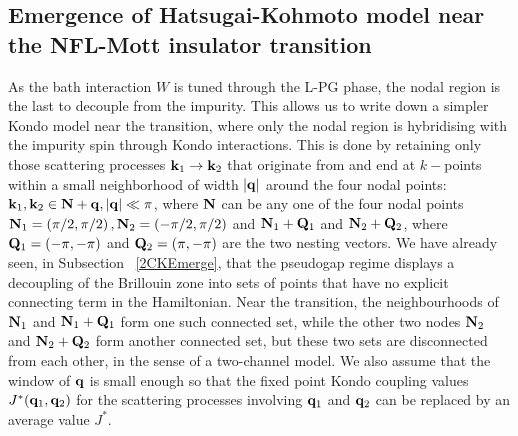 \documentclass[reprint,hidelinks,onecolumn]{revtex4-2}
\begin{document}
\subsection{Emergence of Hatsugai-Kohmoto model near the NFL-Mott insulator transition}\label{hkmDerivation}
As the bath interaction \(W\) is tuned through the L-PG phase, the nodal region is the last to decouple from the impurity. This allows us to write down a simpler Kondo model near the transition, where only the nodal region is hybridising with the impurity spin through Kondo interactions. This is done by retaining only those scattering processes \({\bf k}_1 \to {\bf k}_2\) that originate from and end at \(k-\)points within a small neighborhood of width \(|{\bf q}|\) around the four nodal points: \({\bf k}_1, {\bf k}_2 \in {\bf N} + {\bf q}, |{\bf q}| \ll \pi\), where \({\bf N}\) can be any one of the four nodal points \({\bf N}_{1} = \left(\pi/2, \pi/2\right), {\bf N}_{2} = \left(-\pi/2, \pi/2\right)\) and \({\bf N}_1 + {\bf Q}_1\) and \({\bf N}_{2} + {\bf Q}_2\), where \({\bf Q}_1 = \left(-\pi,-\pi \right)\) and \({\bf Q}_2 = \left( \pi, -\pi \right) \) are the two nesting vectors. We have already seen, in Subsection ~\ref{2CKEmerge}, that the pseudogap regime displays a decoupling of the Brillouin zone into sets of points that have no explicit connecting term in the Hamiltonian. Near the transition, the neighbourhoods of \({\bf N}_{1}\) and \({\bf N}_{1} + {\bf Q}_1\) form one such connected set, while the other two nodes \({\bf N}_{2}\) and \({\bf N}_{2} + {\bf Q}_2\) form another connected set, but these two sets are disconnected from each other, in the sense of a two-channel model. We also assume that the window of \({\bf q}\) is small enough so that the fixed point Kondo coupling values \(J^*({\bf q}_1, {\bf q}_2)\) for the scattering processes involving \({\bf q}_1\) and \({\bf q}_2\) can be replaced by an average value \(J^*\).
\end{document}
